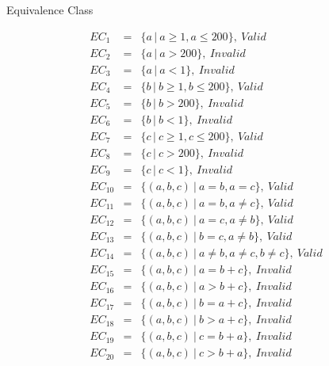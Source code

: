 \documentclass[12pt,a4paper]{report}
\newcommand{\va}{Valid}
\newcommand{\iv}{Invalid}
\begin{document}
{\LARGE Equivalence Class}

\begin{eqnarray*}
    EC_1 &=& \{ a\, |\ a \ge 1, a \le 200 \},\ \va\\
    EC_2 &=& \{ a\, |\ a > 200 \},\ \iv\\
    EC_3 &=& \{ a\, |\ a < 1 \},\ \iv\\
    EC_4 &=& \{ b\, |\ b \ge 1, b \le 200 \},\ \va\\
    EC_5 &=& \{ b\, |\ b > 200 \},\ \iv\\
    EC_6 &=& \{ b\, |\ b < 1 \},\ \iv\\
    EC_7 &=& \{ c\, |\ c \ge 1, c \le 200 \},\ \va\\
    EC_8 &=& \{ c\, |\ c > 200 \},\ \iv\\
    EC_9 &=& \{ c\, |\ c < 1 \},\ \iv\\
    EC_{10} &=& \{ (a, b, c)\ |\ a = b, a = c \},\ \va \\
    EC_{11} &=& \{ (a, b, c)\ |\ a = b, a \neq c \},\ \va \\
    EC_{12} &=& \{ (a, b, c)\ |\ a = c, a \neq b \},\ \va \\
    EC_{13} &=& \{ (a, b, c)\ |\ b = c, a \neq b \},\ \va \\
    EC_{14} &=& \{ (a, b, c)\ |\ a \neq b, a \neq c, b \neq c \},\ \va \\
    EC_{15} &=& \{ (a, b, c)\ |\ a = b + c \},\ \iv \\
    EC_{16} &=& \{ (a, b, c)\ |\ a > b + c \},\ \iv \\
    EC_{17} &=& \{ (a, b, c)\ |\ b = a + c \},\ \iv \\
    EC_{18} &=& \{ (a, b, c)\ |\ b > a + c \},\ \iv \\
    EC_{19} &=& \{ (a, b, c)\ |\ c = b + a \},\ \iv \\
    EC_{20} &=& \{ (a, b, c)\ |\ c > b + a \},\ \iv\\
\end{eqnarray*}

\newpage
\end{document}

